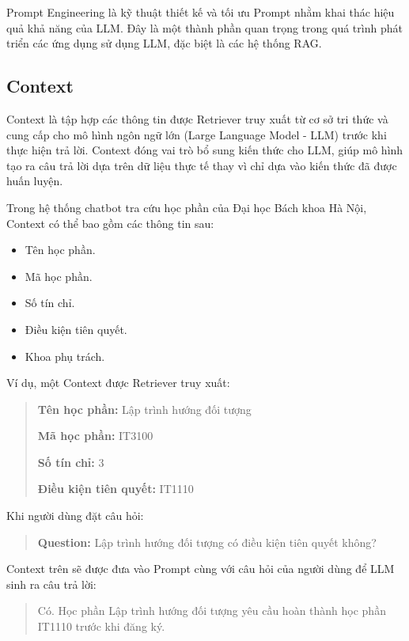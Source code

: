 \documentclass[../DoAn.tex]{subfiles}
\begin{document}
Prompt Engineering là kỹ thuật thiết kế và tối ưu Prompt nhằm khai thác hiệu quả khả năng của LLM. Đây là một thành phần quan trọng trong quá trình phát triển các ứng dụng sử dụng LLM, đặc biệt là các hệ thống RAG.

\subsection{Context}

Context là tập hợp các thông tin được Retriever truy xuất từ cơ sở tri thức và cung cấp cho mô hình ngôn ngữ lớn (Large Language Model - LLM) trước khi thực hiện trả lời. Context đóng vai trò bổ sung kiến thức cho LLM, giúp mô hình tạo ra câu trả lời dựa trên dữ liệu thực tế thay vì chỉ dựa vào kiến thức đã được huấn luyện.

Trong hệ thống chatbot tra cứu học phần của Đại học Bách khoa Hà Nội, Context có thể bao gồm các thông tin sau:

\begin{itemize}
    \item Tên học phần.
    \item Mã học phần.
    \item Số tín chỉ.
    \item Điều kiện tiên quyết.
    \item Khoa phụ trách.
\end{itemize}

Ví dụ, một Context được Retriever truy xuất:

\begin{quote}
    \textbf{Tên học phần:} Lập trình hướng đối tượng

    \textbf{Mã học phần:} IT3100

    \textbf{Số tín chỉ:} 3

    \textbf{Điều kiện tiên quyết:} IT1110
\end{quote}

Khi người dùng đặt câu hỏi:

\begin{quote}
    \textbf{Question:} Lập trình hướng đối tượng có điều kiện tiên quyết không?
\end{quote}

Context trên sẽ được đưa vào Prompt cùng với câu hỏi của người dùng để LLM sinh ra câu trả lời:

\begin{quote}
    Có. Học phần Lập trình hướng đối tượng yêu cầu hoàn thành học phần IT1110 trước khi đăng ký.
\end{quote}
\end{document}
